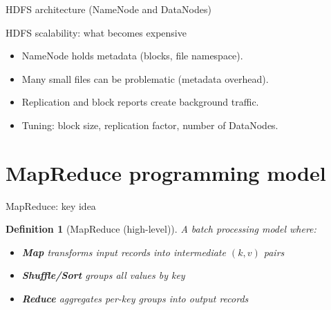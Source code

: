\documentclass[10pt,aspectratio=169]{beamer}
\newtheorem{definition}{Definition}
\begin{document}
\begin{frame}{HDFS architecture (NameNode and DataNodes)}
\centering
{}
\end{frame}

\begin{frame}{HDFS scalability: what becomes expensive}
\begin{itemize}
  \item NameNode holds metadata (blocks, file namespace).
  \item Many small files can be problematic (metadata overhead).
  \item Replication and block reports create background traffic.
  \item Tuning: block size, replication factor, number of DataNodes.
\end{itemize}
\end{frame}

\section{MapReduce programming model}

\begin{frame}{MapReduce: key idea}
\begin{definition}[MapReduce (high-level)]
A batch processing model where:
\begin{itemize}
  \item \textbf{Map} transforms input records into intermediate \((k,v)\) pairs
  \item \textbf{Shuffle/Sort} groups all values by key
  \item \textbf{Reduce} aggregates per-key groups into output records
\end{itemize}
\end{definition}
\end{frame}
\end{document}
